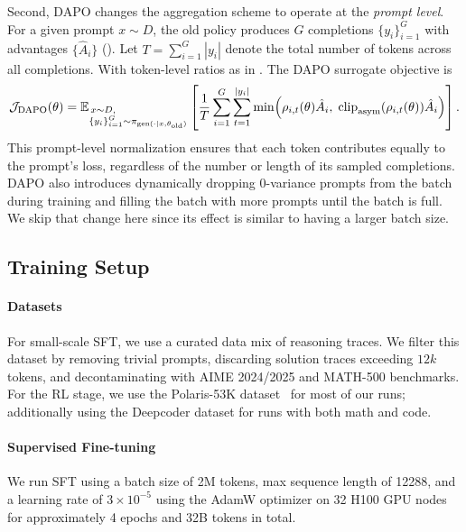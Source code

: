 Second, DAPO changes the aggregation scheme to operate at the \emph{prompt level}.  
For a given prompt $x \sim D$, the old policy produces $G$ completions $\{y_i\}_{i=1}^G$ with advantages $\{\hat{A}_i\}$ ().  
Let $T = \sum_{i=1}^G |y_i|$ denote the total number of tokens across all completions.  
With token-level ratios as in .
The DAPO surrogate objective is
\begin{equation}
\mathcal{J}_{\mathrm{DAPO}}(\theta) 
= \mathbb{E}_{\begin{subarray}{l} \, x \sim D, \\ \{y_i\}_{i=1}^G \sim \pi_{\text{gen}(\cdot \mid x, \theta_{\text{old}})} \end{subarray}}
\left[ \frac{1}{T} \sum_{i=1}^G \sum_{t=1}^{|y_i|}
\min\!\left( \rho_{i,t}(\theta)\hat{A}_i,\; \mathrm{clip}_{\mathrm{asym}}(\rho_{i,t}(\theta))\hat{A}_i \right) \right]. \label{eq:dapo_loss}
\end{equation}
This prompt-level normalization ensures that each token contributes equally to the prompt's loss, regardless of the number or length of its sampled completions.
DAPO also introduces dynamically dropping 0-variance prompts from the batch during training and filling the batch with more prompts until the batch is full. We skip that change here since its effect is similar to having a larger batch size.


\subsection{Training Setup}\label{appendix:setup}

\paragraph{Datasets}
For small-scale SFT, we use a curated data mix of reasoning traces. 
We filter this dataset by removing trivial prompts, discarding solution traces exceeding $12k$ tokens, and decontaminating with AIME 2024/2025 \citep{aime} and MATH-500 \citep{hendrycks2021measuring} benchmarks. For the RL stage, we use the Polaris-53K dataset~\citep{polaris2025} for most of our runs; additionally using the Deepcoder dataset \citep{deepcoder2025} for runs with both math and code.

\paragraph{Supervised Fine-tuning}
We run SFT using a batch size of 2M tokens, max sequence length of 12288, and a learning rate of $3 \times 10^{-5}$ using the AdamW optimizer \citep{adamw} on 32 H100 GPU nodes for approximately 4 epochs and 32B tokens in total.

